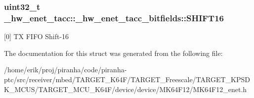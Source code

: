 \subsubsection[{\texorpdfstring{S\+H\+I\+F\+T16}{SHIFT16}}]{\setlength{\rightskip}{0pt plus 5cm}uint32\+\_\+t \+\_\+hw\+\_\+enet\+\_\+tacc\+::\+\_\+hw\+\_\+enet\+\_\+tacc\+\_\+bitfields\+::\+S\+H\+I\+F\+T16}\hypertarget{struct__hw__enet__tacc_1_1__hw__enet__tacc__bitfields_a6a0ad30acabb718aa80590569abadf43}{}\label{struct__hw__enet__tacc_1_1__hw__enet__tacc__bitfields_a6a0ad30acabb718aa80590569abadf43}
\mbox{[}0\mbox{]} TX F\+I\+FO Shift-\/16 

The documentation for this struct was generated from the following file\+:\begin{DoxyCompactItemize}
\item 
/home/erik/proj/piranha/code/piranha-\/ptc/src/receiver/mbed/\+T\+A\+R\+G\+E\+T\+\_\+\+K64\+F/\+T\+A\+R\+G\+E\+T\+\_\+\+Freescale/\+T\+A\+R\+G\+E\+T\+\_\+\+K\+P\+S\+D\+K\+\_\+\+M\+C\+U\+S/\+T\+A\+R\+G\+E\+T\+\_\+\+M\+C\+U\+\_\+\+K64\+F/device/device/\+M\+K64\+F12/M\+K64\+F12\+\_\+enet.\+h\end{DoxyCompactItemize}
